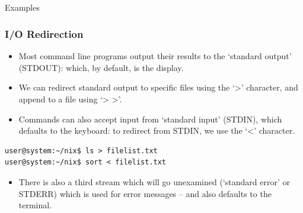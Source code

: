\documentclass[10pt]{beamer}
\begin{document}
\subsection{}
\begin{frame}[fragile]{Examples}
\frametitle{I/O Redirection}
\begin{itemize}
\item Most command line programs output their results to the ‘standard output’ (STDOUT): which, by default, is the display.
\item We can redirect standard output to specific files using the ‘>’ character, and append to a file using ‘> >’.
\item Commands can also accept input from ‘standard input’ (STDIN), which defaults to the keyboard: to redirect from STDIN, we use the ‘<’ character.
\end{itemize}
\begin{table}
\begin{lstlisting}[style=BashInputStyle]
user@system:~/nix$ ls > filelist.txt
user@system:~/nix$ sort < filelist.txt
\end{lstlisting}
\end{table}
\begin{itemize}
\item There is also a third stream which will go unexamined (‘standard error’ or STDERR) which is used for error messages – and also defaults to the terminal.
\end{itemize}
\end{frame}
\end{document}
